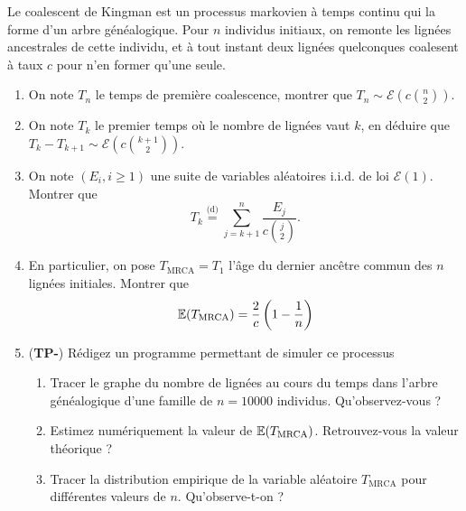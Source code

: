 \documentclass[]{exercices}
\begin{document}
\begin{exercice}
Le coalescent de Kingman est un processus markovien à temps continu qui la forme d'un arbre généalogique. Pour $n$ individus initiaux, on remonte les lignées ancestrales de cette individu, et à tout instant deux lignées quelconques coalesent à taux $c$ pour n'en former qu'une seule.
\begin{enumerate}
  \item On note $T_n$ le temps de première coalescence, montrer que $T_n \sim \mathcal{E}(c\binom{n}{2})$.
  \item On note $T_k$ le premier temps où le nombre de lignées vaut $k$, en déduire que $T_{k} - T_{k+1} \sim \mathcal{E}(c\binom{k+1}{2})$.
  \item On note $(E_i, i \geq 1)$ une suite de variables aléatoires i.i.d. de loi $\mathcal{E}(1)$. Montrer que
  \[
    T_k \overset{\text{(d)}}{=} \sum_{j=k+1}^{n} \frac{E_j}{c \binom{j}{2}}.
  \]
  \item En particulier, on pose $T_\mathrm{MRCA} = T_1$ l'âge du dernier ancêtre commun des $n$ lignées initiales. Montrer que
  \[
    \mathbb{E}(T_\mathrm{MRCA}) = \frac{2}{c}\left(1 - \frac{1}{n}\right)
  \]
  \item (\textbf{TP-}) Rédigez un programme permettant de simuler ce processus
  \begin{enumerate}
  \item Tracer le graphe du nombre de lignées au cours du temps dans l'arbre généalogique d'une famille de $n=10000$ individus. Qu'observez-vous ?
  \item Estimez numériquement la valeur de $\mathbb{E}(T_\mathrm{MRCA})$. Retrouvez-vous la valeur théorique ?
  \item Tracer la distribution empirique de la variable aléatoire $T_\mathrm{MRCA}$ pour différentes valeurs de $n$. Qu'observe-t-on ?
  \end{enumerate}
\end{enumerate}
\end{exercice}
\end{document}
